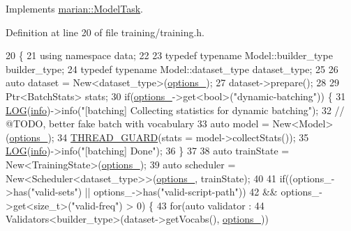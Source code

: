 Implements \hyperlink{structmarian_1_1ModelTask_a2f4fddd0f227555bf792e3c3d4bfdb0d}{marian\+::\+Model\+Task}.



Definition at line 20 of file training/training.\+h.


\begin{DoxyCode}
20              \{
21     \textcolor{keyword}{using namespace }data;
22 
23     \textcolor{keyword}{typedef} \textcolor{keyword}{typename} Model::builder\_type builder\_type;
24     \textcolor{keyword}{typedef} \textcolor{keyword}{typename} Model::dataset\_type dataset\_type;
25 
26     \textcolor{keyword}{auto} dataset = New<dataset\_type>(\hyperlink{classmarian_1_1Train_ade849d6d35d7233dda8b58114c9c30a9}{options\_});
27     dataset->prepare();
28 
29     Ptr<BatchStats> stats;
30     \textcolor{keywordflow}{if}(\hyperlink{classmarian_1_1Train_ade849d6d35d7233dda8b58114c9c30a9}{options\_}->get<\textcolor{keywordtype}{bool}>(\textcolor{stringliteral}{"dynamic-batching"})) \{
31       \hyperlink{amun_2common_2logging_8h_a8cad147aca8c526d3c8a03ae14d5c87d}{LOG}(\hyperlink{namespacefix__hard_a31eedbb056537bc1bef47ad5e40eaa68}{info})->info(\textcolor{stringliteral}{"[batching] Collecting statistics for dynamic batching"});
32       \textcolor{comment}{// @TODO, better fake batch with vocabulary}
33       \textcolor{keyword}{auto} model = New<Model>(\hyperlink{classmarian_1_1Train_ade849d6d35d7233dda8b58114c9c30a9}{options\_});
34       \hyperlink{definitions_8h_a67d986fe20c72043e476836c564341b3}{THREAD\_GUARD}(stats = model->collectStats());
35       \hyperlink{amun_2common_2logging_8h_a8cad147aca8c526d3c8a03ae14d5c87d}{LOG}(\hyperlink{namespacefix__hard_a31eedbb056537bc1bef47ad5e40eaa68}{info})->info(\textcolor{stringliteral}{"[batching] Done"});
36     \}
37 
38     \textcolor{keyword}{auto} trainState = New<TrainingState>(\hyperlink{classmarian_1_1Train_ade849d6d35d7233dda8b58114c9c30a9}{options\_});
39     \textcolor{keyword}{auto} scheduler = New<Scheduler<dataset\_type>>(\hyperlink{classmarian_1_1Train_ade849d6d35d7233dda8b58114c9c30a9}{options\_}, trainState);
40 
41     \textcolor{keywordflow}{if}((options\_->has(\textcolor{stringliteral}{"valid-sets"}) || options\_->has(\textcolor{stringliteral}{"valid-script-path"}))
42        && options\_->get<\textcolor{keywordtype}{size\_t}>(\textcolor{stringliteral}{"valid-freq"}) > 0) \{
43       \textcolor{keywordflow}{for}(\textcolor{keyword}{auto} validator :
44           Validators<builder\_type>(dataset->getVocabs(), \hyperlink{classmarian_1_1Train_ade849d6d35d7233dda8b58114c9c30a9}{options\_}))

\end{DoxyCode}
